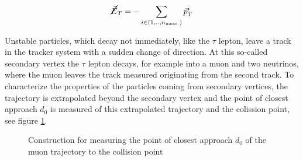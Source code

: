 \begin{equation}
	\label{eq:eq_2_6}
	\cancel{\vec{E}}_{T} = - \sum_{i \in (1, .., n_{\text{meas.}})} \vec{p}_{T}^{i} 
\end{equation}

Unstable particles, which decay not immediately, like the $\tau$ lepton, leave a track in the tracker system with a sudden change of direction. At this so-called secondary vertex the $\tau$ lepton decays, for example into a muon and two neutrinos, where the muon leaves the track measured originating from the second track. To characterize the properties of the particles coming from secondary vertices, the trajectory is extrapolated beyond the secondary vertex and the point of closest approach $d_{0}$ is measured of this extrapolated trajectory and the colission point, see figure \ref{fig:fig_2_11}.

\begin{figure}[ht]
	\centering
	\caption[Construction of point of closest approach]{Construction for measuring the point of closest approach $d_{0}$ of the muon trajectory to the collision point}
	\label{fig:fig_2_11}
\end{figure}


